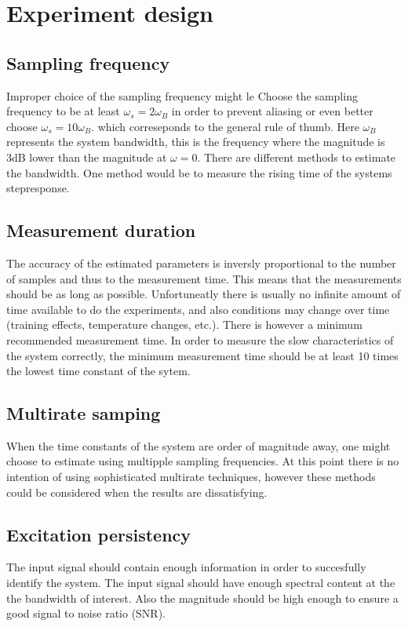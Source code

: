 \section{Experiment design}

\subsection{Sampling frequency}
Improper choice of the sampling frequency might le
Choose the sampling frequency to be at least $\omega_s=2\omega_B$ in order to prevent aliasing or even better choose $\omega_s = 10\omega_B$. which correseponds to the general rule of thumb. Here $\omega_B$ represents the system bandwidth,  this is the frequency where the magnitude is 3dB lower than the magnitude at $\omega=0$. There are different methods to estimate the bandwidth. One method would be to measure the rising time of the systems stepresponse. 
\subsection{Measurement duration}
The accuracy of the estimated parameters is inversly proportional to the number of samples and thus to the measurement time. This means that the measurements should be as long as possible. Unfortuneatly there is usually no infinite amount of time available to do the experiments, and also conditions may change over time (training effects, temperature changes, etc.). There is however a minimum recommended measurement time. In order to measure the slow characteristics of the system correctly, the minimum measurement time should be at least 10 times the lowest time constant of the sytem.
\subsection{Multirate samping}
When the time constants of the system are order of magnitude away, one might choose to estimate using multipple sampling frequencies. At this point there is no intention of using sophisticated multirate techniques, however these methods could be considered when the results are dissatisfying. 
\subsection{Excitation persistency}
The input signal should contain enough information in order to succesfully identify the system. The input signal should have enough spectral content at the the bandwidth of interest. Also the magnitude should be high enough to ensure a good signal to noise ratio (SNR). 

